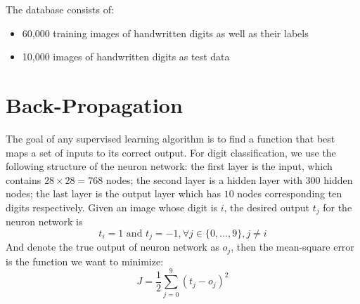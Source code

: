 \documentclass{article} %
\begin{document}
The database consists of:
\begin{itemize}
\item   60,000 training images of handwritten digits as well as their labels
\item   10,000 images of handwritten digits as test data
\end{itemize}


\section{Back-Propagation}
The goal of any supervised learning algorithm is to find a function that best maps a set of inputs to its correct output.
For digit classification, we use the following structure of the neuron network: the first layer is the input, which contains $28 \times 28 = 768$ nodes; the second layer is a hidden layer with $300$ hidden nodes; the last layer is the output layer which has $10$ nodes corresponding ten digits respectively.
Given an image whose digit is $i$, the desired output $t_j$ for the neuron network is
\[ t_i = 1 \textrm{ and } t_j = -1, \forall j \in \{0,\ldots,9\}, j \ne i \]
And denote the true output of neuron network as $o_j$, then the mean-square error is the function we want to minimize:
\[ J = \frac{1}{2} \sum_{j=0}^9 {(t_j-o_j)}^2 \]
\end{document}

